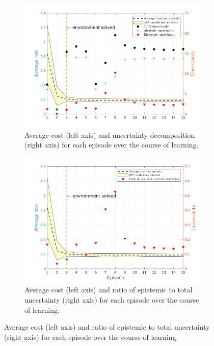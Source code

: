 \begin{figure}[htp!]
    \vspace{4ex}
  \begin{subfigure}[b]{0.48\linewidth}
    \centering
    \includegraphics[height=0.22\textheight,width=1\textwidth]{Chapter3/Figures/cp_uncertainty.png} 
    \caption{Average cost (left axis) and uncertainty decomposition (right axis) for each episode over the course of learning.} 
    \label{Fig:Re-cp-uncertainty} 
  \end{subfigure}
  \hspace{\fill}
  \begin{subfigure}[b]{0.48\linewidth}
    \centering
    \includegraphics[height=0.22\textheight,width=1\textwidth]{Chapter3/Figures/cp_uncertainty_norm.png} 
    \caption{Average cost (left axis) and ratio of epistemic to total uncertainty (right axis) for each episode over the course of learning.} 

\end{subfigure}
\end{figure}
